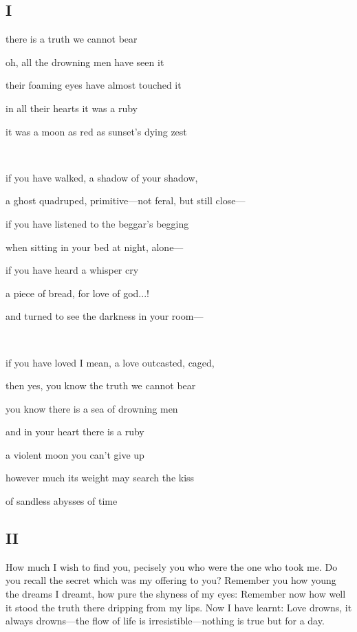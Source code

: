 \documentclass[a4paper, 12pt]{article}
\begin{document}
\subsection{I}

   there is a truth we cannot bear

   oh, all the drowning men have seen it

   their foaming eyes have almost touched it 

   in all their hearts it was a ruby 

   it was a moon as red as sunset's dying zest

   ~ ~ ~ 

   if you have walked, a shadow of your shadow,
   
   a ghost quadruped, primitive---not feral, but still close---

   if you have listened to the beggar's begging

   when sitting in your bed at night, alone--- 

   if you have heard a whisper cry 
   
   a piece of bread, for love of god...!

   and turned to see the darkness in your room---

   ~ ~ ~ 

   if you have loved I mean, a love outcasted, caged,

   then yes, you know the truth we cannot bear 

   you know there is a sea of drowning men 

   and in your heart there is a ruby 

   a violent moon you can't give up

   however much its weight may search the kiss 

   of sandless abysses of time




   \pagebreak

   \subsection{II}

How much I wish to find you, pecisely you who were the one who took me. Do you
recall the secret which was my offering to you? Remember you how young the
dreams I dreamt, how pure the shyness of my eyes: Remember now how well it stood 
the truth there dripping from my lips. Now I have learnt: Love drowns, it
always drowns---the flow of life is irresistible---nothing is true but for a
day.
\end{document}
